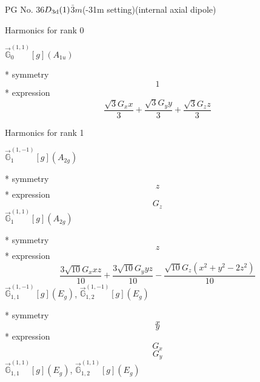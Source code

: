 \documentclass[fleqn,8pt]{jsarticle}
\begin{document}
\setcounter{MaxMatrixCols}{32}

\renewcommand{\tablename}{Table~}
\renewcommand{\figurename}{Figure~}
\begin{center}
\LARGE
PG No. 36\quad$D_{\rm 3d}(1)$\quad$\bar{3}m$\quad(-31m setting)\quad[ trigonal ] (internal axial dipole)
\end{center}

\noindent * Harmonics for rank 0

\noindent\quad $\vec{\mathbb{G}}_{0}^{(1,1)}[g](A_{1u})$

\noindent\quad ** symmetry
\begin{dmath*}
1
\end{dmath*}
\noindent\quad ** expression
\begin{dmath*}
\frac{\sqrt{3} G_{x} x}{3} + \frac{\sqrt{3} G_{y} y}{3} + \frac{\sqrt{3} G_{z} z}{3}
\end{dmath*}

\noindent * Harmonics for rank 1

\noindent\quad $\vec{\mathbb{G}}_{1}^{(1,-1)}[g](A_{2g})$

\noindent\quad ** symmetry
\begin{dmath*}
z
\end{dmath*}
\noindent\quad ** expression
\begin{dmath*}
G_{z}
\end{dmath*}
\noindent\quad $\vec{\mathbb{G}}_{1}^{(1,1)}[g](A_{2g})$

\noindent\quad ** symmetry
\begin{dmath*}
z
\end{dmath*}
\noindent\quad ** expression
\begin{dmath*}
\frac{3 \sqrt{10} G_{x} x z}{10} + \frac{3 \sqrt{10} G_{y} y z}{10} - \frac{\sqrt{10} G_{z} \left(x^{2} + y^{2} - 2 z^{2}\right)}{10}
\end{dmath*}
\noindent\quad $\vec{\mathbb{G}}_{1,1}^{(1,-1)}[g](E_{g})$, $\vec{\mathbb{G}}_{1,2}^{(1,-1)}[g](E_{g})$

\noindent\quad ** symmetry
\begin{dmath*}
x
\end{dmath*}
\begin{dmath*}
y
\end{dmath*}
\noindent\quad ** expression
\begin{dmath*}
G_{x}
\end{dmath*}
\begin{dmath*}
G_{y}
\end{dmath*}
\noindent\quad $\vec{\mathbb{G}}_{1,1}^{(1,1)}[g](E_{g})$, $\vec{\mathbb{G}}_{1,2}^{(1,1)}[g](E_{g})$
\end{document}
